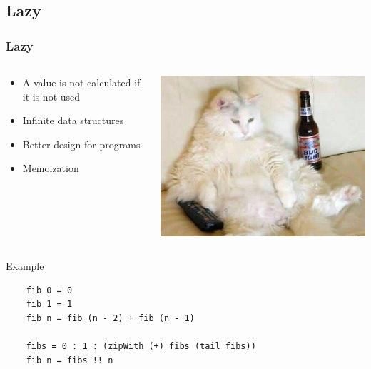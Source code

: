 \documentclass{beamer}
\begin{document}
\subsection{Lazy}
\begin{frame}[fragile]
\frametitle{Lazy}

 \begin{columns}[]
  \begin{column}[]{5cm}
   \begin{itemize}
  \item A value is not calculated if it is not used
  \item Infinite data structures
  \item Better design for programs
  \item Memoization
 \end{itemize}
  \end{column}
  \begin{column}[]{5cm}
    \includegraphics[width=0.8\linewidth]{figs/lazy_cat}
  \end{column}
 \end{columns}

 \begin{block}{Example}
  \begin{lstlisting}
    fib 0 = 0
    fib 1 = 1
    fib n = fib (n - 2) + fib (n - 1)

    fibs = 0 : 1 : (zipWith (+) fibs (tail fibs))
    fib n = fibs !! n
  \end{lstlisting}
 \end{block}
 
\end{frame}
\end{document}
